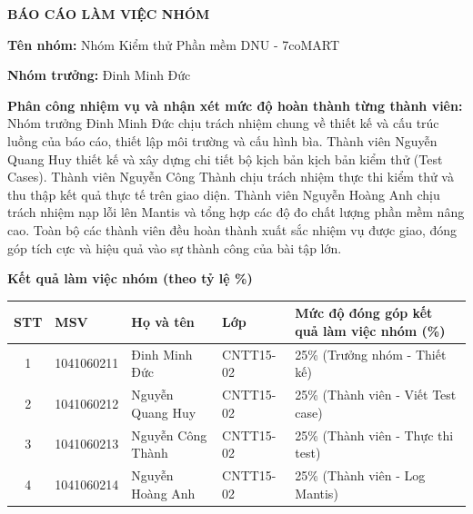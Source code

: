 \newpage
\thispagestyle{empty} %

\begin{center}
    \textbf{\large BÁO CÁO LÀM VIỆC NHÓM}
\end{center}
\vspace{0.5cm}

\noindent \textbf{Tên nhóm:} Nhóm Kiểm thử Phần mềm DNU - 7coMART \\
\vspace{0.2cm}

\noindent \textbf{Nhóm trưởng:} Đinh Minh Đức \\
\vspace{0.2cm}

\noindent \textbf{Phân công nhiệm vụ và nhận xét mức độ hoàn thành từng thành viên:} \\
Nhóm trưởng Đinh Minh Đức chịu trách nhiệm chung về thiết kế và cấu trúc luồng của báo cáo, thiết lập môi trường và cấu hình bìa. Thành viên Nguyễn Quang Huy thiết kế và xây dựng chi tiết bộ kịch bản kịch bản kiểm thử (Test Cases). Thành viên Nguyễn Công Thành chịu trách nhiệm thực thi kiểm thử và thu thập kết quả thực tế trên giao diện. Thành viên Nguyễn Hoàng Anh chịu trách nhiệm nạp lỗi lên Mantis và tổng hợp các độ đo chất lượng phần mềm nâng cao. Toàn bộ các thành viên đều hoàn thành xuất sắc nhiệm vụ được giao, đóng góp tích cực và hiệu quả vào sự thành công của bài tập lớn.
\vspace{0.5cm}

\noindent \textbf{Kết quả làm việc nhóm (theo tỷ lệ \%)}

\begin{table}[h]
    \centering
    \renewcommand{\arraystretch}{1.5}
    \begin{tabular}{|c|p{2.5cm}|p{4cm}|p{2cm}|p{4.5cm}|}
        \hline
        \textbf{STT} & \centering\textbf{MSV} & \centering\textbf{Họ và tên} & \centering\textbf{Lớp} & \centering\textbf{Mức độ đóng góp kết quả làm việc nhóm (\%)} \tabularnewline
        \hline
        1 & 1041060211 & Đinh Minh Đức & CNTT15-02 & 25\% (Trưởng nhóm - Thiết kế) \\ \hline
        2 & 1041060212 & Nguyễn Quang Huy & CNTT15-02 & 25\% (Thành viên - Viết Test case) \\ \hline
        3 & 1041060213 & Nguyễn Công Thành & CNTT15-02 & 25\% (Thành viên - Thực thi test) \\ \hline
        4 & 1041060214 & Nguyễn Hoàng Anh & CNTT15-02 & 25\% (Thành viên - Log Mantis) \\ \hline
    \end{tabular}
\end{table}

